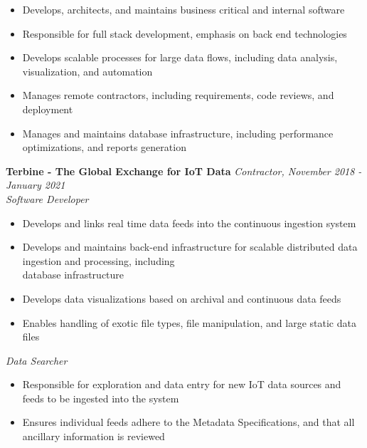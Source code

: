 \documentclass{res}
\begin{document}
\begin{resume}
			\begin{itemize} \itemsep -2pt
				\item Develops, architects, and maintains business critical and internal software
				\item Responsible for full stack development, emphasis on back end technologies
				\item Develops scalable processes for large data flows, including data analysis, visualization, and automation
				\item Manages remote contractors, including requirements, code reviews, and deployment
                \item Manages and maintains database infrastructure, including performance optimizations, and reports generation
			\end{itemize} \vspace{-2mm}
    
		{\bf Terbine - The Global Exchange for IoT Data} \hfill \emph{Contractor, November 2018 - January 2021} \\
			\emph{Software Developer}

			\begin{itemize} \itemsep -2pt
				\item Develops and links real time data feeds into the continuous ingestion system
				\item Develops and maintains back-end infrastructure for scalable distributed data ingestion and processing, including \  \\
        database infrastructure
				\item Develops data visualizations based on archival and continuous data feeds
				\item Enables handling of exotic file types, file manipulation, and large static data files
			\end{itemize} \vspace{-2mm}

			\emph{Data Searcher}

			\begin{itemize} \itemsep -2pt
				\item Responsible for exploration and data entry for new IoT data sources and feeds to be ingested into the system
				\item Ensures individual feeds adhere to the Metadata Specifications, and that all ancillary information is reviewed
			\end{itemize} \vspace{-2mm}


\end{resume}
\end{document}
